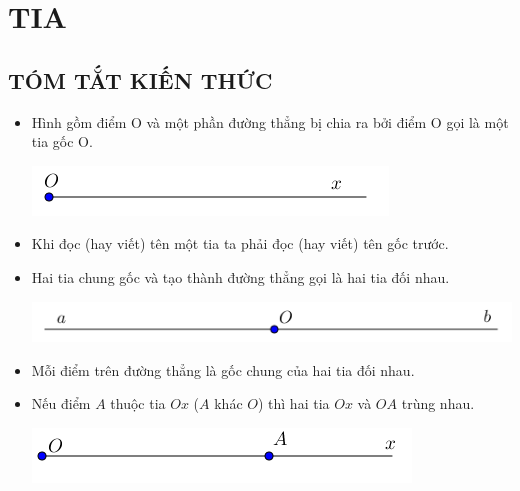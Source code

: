 \section{TIA}
\subsection{TÓM TẮT KIẾN THỨC}
\begin{tomtat}
\begin{itemize}
\item Hình gồm điểm O và một phần đường thẳng bị chia ra bởi điểm O gọi là một tia gốc O.
	\begin{center}
	\includegraphics[scale=0.7]{img/bai4_vd1}
	\end{center}
	
	\item [] Khi đọc (hay viết) tên một tia ta phải đọc (hay viết) tên gốc trước.
\item Hai tia chung gốc và tạo thành đường thẳng gọi là hai tia đối nhau.
	\begin{center}
	\includegraphics[scale=0.7]{img/bai4_vd2}
	\end{center}
	\item [] Mỗi điểm trên đường thẳng là gốc chung của hai tia đối nhau.
\item Nếu điểm $A$ thuộc tia $Ox$ ($A$ khác $O$) thì hai tia $Ox$ và $OA$ trùng nhau.
	\begin{center}
	\includegraphics[scale=0.7]{img/bai4_vd3}
	\end{center}
	
\end{itemize}
\end{tomtat}


